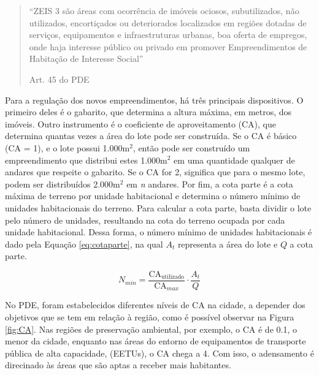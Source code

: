 \begin{quotation}
    ``ZEIS 3 são áreas com ocorrência de imóveis ociosos, subutilizados, não utilizados, encortiçados ou deteriorados localizados em regiões dotadas de serviços, equipamentos e infraestruturas urbanas, boa oferta de empregos, onde haja interesse público ou privado em promover Empreendimentos de Habitação de Interesse Social''

    \raggedleft Art. 45 do PDE \cite{PDE}
\end{quotation}

Para a regulação dos novos empreendimentos, há três principais dispositivos. O primeiro deles é o gabarito, que determina a altura máxima, em metros, dos imóveis. Outro instrumento é o coeficiente de aproveitamento (CA), que determina quantas vezes a área do lote pode ser construída. Se o CA é básico (CA = 1), e o lote possui 1.000m$^2$, então pode ser construído um empreendimento que distribui estes 1.000m$^2$ em uma quantidade qualquer de andares que respeite o gabarito. Se o CA for 2, significa que para o mesmo lote, podem ser distribuídos 2.000m$^2$ em \textit{n} andares. Por fim, a cota parte é a cota máxima de terreno por unidade habitacional e determina o número mínimo de unidades habitacionais do terreno. Para calcular a cota parte, basta dividir o lote pelo número de unidades, resultando na cota do terreno ocupada por cada unidade habitacional. Dessa forma, o número mínimo de unidades habitacionais é dado pela Equação \ref{eq:cotaparte}, na qual $A_t$ representa a área do lote e $Q$ a cota parte.

\begin{equation}
    N_{min} = \frac{\text{CA}_{\text{utilizado}}}{\text{CA}_{max}}\cdot \frac{A_t}{Q}
    \label{eq:cotaparte}
\end{equation}

No PDE, foram estabelecidos diferentes níveis de CA na cidade, a depender dos objetivos que se tem em relação à região, como é possível observar na Figura \ref{fig:CA}. Nas regiões de preservação ambiental, por exemplo, o CA é de 0.1, o menor da cidade, enquanto nas áreas do entorno de equipamentos de transporte pública de alta capacidade, (EETUs), o CA chega a 4. Com isso, o adensamento é direcinado às áreas que são aptas a receber mais habitantes.

